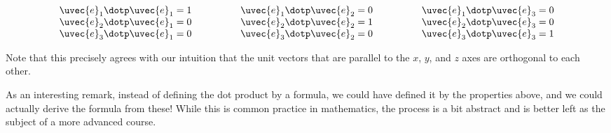 \documentclass{ximera}
\begin{document}
\[
\begin{array}{lll}
\uvec{e}_1 \dotp \uvec{e}_1 = 1 \qquad \qquad & \uvec{e}_1 \dotp \uvec{e}_2 = 0 \qquad \qquad & \uvec{e}_1 \dotp \uvec{e}_3 = 0 \\
\uvec{e}_2 \dotp \uvec{e}_1 = 0 & \uvec{e}_2 \dotp \uvec{e}_2 = 1 & \uvec{e}_2 \dotp \uvec{e}_3 = 0 \\
\uvec{e}_3 \dotp \uvec{e}_1 = 0 & \uvec{e}_3 \dotp \uvec{e}_2 = 0 & \uvec{e}_3 \dotp \uvec{e}_3 = 1
\end{array}
\]

Note that this precisely agrees with our intuition that the unit vectors that are parallel to the $x$, $y$, and $z$ axes are orthogonal to each other.

As an interesting remark, instead of defining the dot product by a formula, we could have
defined it by the properties above, and we could actually derive the formula from these!  While this is common practice in
mathematics, the process is a bit abstract and is better left as the subject of a more advanced course.

\end{document}
